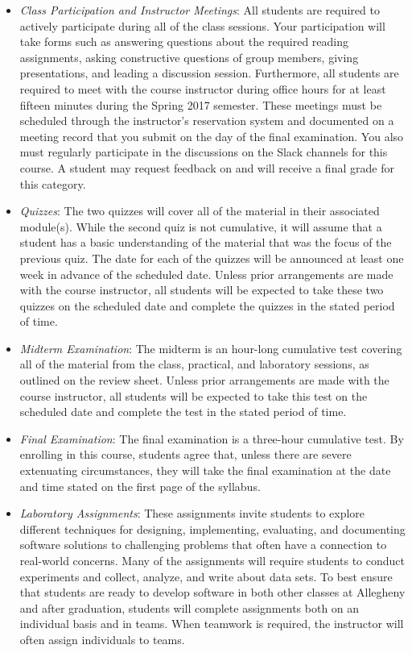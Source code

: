 \begin{itemize}

  \item {\em Class Participation and Instructor Meetings\/}: All students are required to actively participate during
    all of the class sessions. Your participation will take forms such as answering questions about the required reading
    assignments, asking constructive questions of group members, giving presentations, and leading a discussion session.
    Furthermore, all students are required to meet with the course instructor during office hours for at least fifteen
    minutes during the Spring 2017 semester. These meetings must be scheduled through the instructor's reservation
    system and documented on a meeting record that you submit on the day of the final examination. You also must
    regularly participate in the discussions on the Slack channels for this course. A student may request feedback on
    and will receive a final grade for this category.

  \item {\em Quizzes\/}: The two quizzes will cover all of the material in their associated module(s).  While the second
    quiz is not cumulative, it will assume that a student has a basic understanding of the material that
    was the focus of the previous quiz.  The date for each of the quizzes will be announced at least one week in
    advance of the scheduled date.  Unless prior arrangements are made with the course instructor, all students will be
    expected to take these two quizzes on the scheduled date and complete the quizzes in the stated period of time.

  \item {\em Midterm Examination\/}: The midterm is an hour-long cumulative test covering all of the material from the
    class, practical, and laboratory sessions, as outlined on the review sheet. Unless prior arrangements are made with
    the course instructor, all students will be expected to take this test on the scheduled date and complete the test
    in the stated period of time.

  \item {\em Final Examination\/}: The final examination is a three-hour cumulative test.  By enrolling in this
    course, students agree that, unless there are severe extenuating circumstances, they will take the final examination
    at the date and time stated on the first page of the syllabus.

  \item {\em Laboratory Assignments\/}: These assignments invite students to explore different techniques for designing,
    implementing, evaluating, and documenting software solutions to challenging problems that often have a connection to
    real-world concerns.  Many of the assignments will require students to conduct experiments and collect, analyze, and
    write about data sets.  To best ensure that students are ready to develop software in both other classes at
    Allegheny and after graduation, students will complete assignments both on an individual basis and in teams.  When
    teamwork is required, the instructor will often assign individuals to teams.


\end{itemize}

